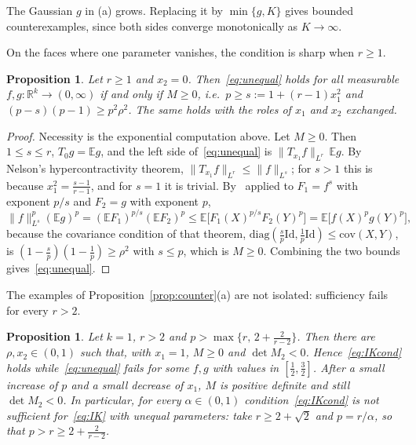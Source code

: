 \documentclass[11pt]{amsart}
\newtheorem{proposition}[theorem]{Proposition}
\theoremstyle{definition}
\newcommand{\E}{\mathbb{E}}
\newcommand{\R}{\mathbb{R}}
\newcommand{\Id}{\mathrm{Id}}
\begin{document}
The Gaussian $g$ in (a) grows. Replacing it by $\min\{g,K\}$ gives bounded counterexamples,
since both sides converge monotonically as $K\to\infty$.

On the faces where one parameter vanishes, the condition is sharp when $r\ge1$.

\begin{proposition}\label{prop:face}
Let $r\ge1$ and $x_2=0$. Then~\eqref{eq:unequal} holds for all measurable $f,g:\R^k\to(0,\infty)$ if and only if
$M\ge0$, i.e.\ $p\ge s:=1+(r-1)x_1^2$ and $(p-s)(p-1)\ge p^2\rho^2$. The same holds with the roles of $x_1$ and $x_2$
exchanged.
\end{proposition}

\begin{proof}
Necessity is the exponential computation above. Let $M\ge0$. Then $1\le s\le r$, $T_0g=\E g$, and the left side
of~\eqref{eq:unequal} is $\|T_{x_1}f\|_{L^r}\,\E g$. By Nelson's hypercontractivity theorem, $\|T_{x_1}f\|_{L^r}\le
\|f\|_{L^s}$; for $s>1$ this is because $x_1^2=\frac{s-1}{r-1}$, and for $s=1$ it is trivial. By~\cite[Theorem~B]{IK25}
applied to $F_1=f^s$ with exponent $p/s$ and $F_2=g$ with exponent $p$,
\[
\|f\|_{L^s}^p(\E g)^p=(\E F_1)^{p/s}(\E F_2)^p\le\E\big[F_1(X)^{p/s}F_2(Y)^p\big]=\E\big[f(X)^pg(Y)^p\big],
\]
because the covariance condition of that theorem, $\mathrm{diag}(\frac sp\Id,\frac1p\Id)\le\mathrm{cov}(X,Y)$, is
$(1-\frac sp)(1-\frac1p)\ge\rho^2$ with $s\le p$, which is $M\ge0$. Combining the two bounds gives~\eqref{eq:unequal}.
\end{proof}

The examples of Proposition~\ref{prop:counter}(a) are not isolated: sufficiency fails for every $r>2$.

\begin{proposition}\label{prop:allr}
Let $k=1$, $r>2$ and $p>\max\{r,\,2+\frac2{r-2}\}$. Then there are $\rho,x_2\in(0,1)$ such that, with $x_1=1$,
$M\ge0$ and $\det M_2<0$. Hence~\eqref{eq:IKcond} holds while~\eqref{eq:unequal} fails for some $f,g$ with values
in $[\frac12,\frac32]$. After a small increase of $p$ and a small decrease of $x_1$, $M$ is positive definite and
still $\det M_2<0$. In particular, for every $\alpha\in(0,1)$ condition~\eqref{eq:IKcond} is not sufficient
for~\eqref{eq:IK} with unequal parameters: take $r\ge2+\sqrt2$ and $p=r/\alpha$, so that $p>r\ge2+\frac2{r-2}$.
\end{proposition}
\end{document}
